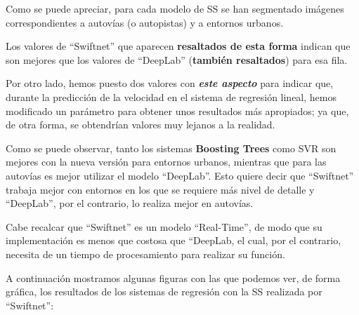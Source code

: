 Como se puede apreciar, para cada modelo de \ac{SS} se han segmentado imágenes correspondientes a autovías (o autopistas) y a entornos urbanos.

Los valores de ``Swiftnet'' que aparecen \textbf{resaltados de esta forma} indican que son mejores que los valores de ``DeepLab'' (\textbf{también resaltados}) para esa fila.

Por otro lado, hemos puesto dos valores con \textit{\textbf{este aspecto}} para indicar que, durante la predicción de la velocidad en el sistema de regresión lineal, hemos modificado un parámetro para obtener unos resultados más apropiados; ya que, de otra forma, se obtendrían valores muy lejanos a la realidad.

Como se puede observar, tanto los sistemas \textbf{Boosting Trees} como \ac{SVR} son mejores con la nueva versión para entornos urbanos, mientras que para las autovías es mejor utilizar el modelo ``DeepLab''. Esto quiere decir que ``Swiftnet'' trabaja mejor con entornos en los que se requiere más nivel de detalle y ``DeepLab'', por el contrario, lo realiza mejor en autovías.

Cabe recalcar que ``Swiftnet'' \cite{swiftnet} es un modelo ``Real-Time'', de modo que su implementación es menos que costosa que ``DeepLab, el cual, por el contrario, necesita de un tiempo de procesamiento para realizar su función.

A continuación mostramos algunas figuras con las que podemos ver, de forma gráfica, los resultados de los sistemas de regresión con la \ac{SS} realizada por ``Swiftnet'':

